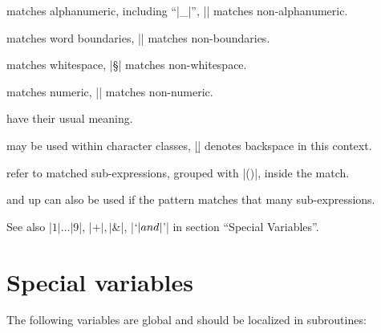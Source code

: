 \begin{enum}{1cm}

matches alphanumeric, including ``|_|'', |\W| matches non-alphanumeric.

matches word boundaries, |\B| matches non-boundaries.

matches whitespace, |\S| matches non-whitespace.

matches numeric, |\D| matches non-numeric.

have their usual meaning.

 may be used within character classes, |\b| denotes backspace in this context.

refer to matched sub-expressions, grouped with |()|, inside
the match. 

and up can also be used if the pattern
matches that many sub-expressions. 

\end{enum}

See also |$1|\ldots|$9|, |$+|, |$&|, |$`| and |$'| in section ``Special
Variables''.

\section{Special variables} 

The following variables are global and should be localized in subroutines:

